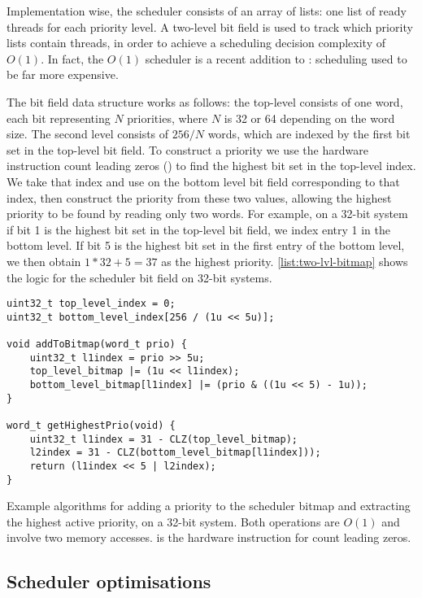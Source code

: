 Implementation wise, the scheduler consists of an array of lists: one list of ready threads for each
priority level. A two-level bit field is used to track which priority lists contain threads, 
in order to achieve a scheduling decision complexity of $O(1)$. In fact, the \(O(1)\) scheduler is a
recent addition to \selfour: scheduling used to be far more expensive.

The bit field data structure works as follows: the
top-level consists of one word, each bit representing $N$ priorities, where $N$ is 32 or 64
depending on the word size. The second level consists of $256/N$ words, which are indexed by the first bit set in the
top-level bit field. To construct a priority we use the hardware instruction count leading zeros
() to find the highest bit set in the top-level index. We take that index and use
 on the bottom level bit field corresponding to that index, then construct the priority
from these two values, allowing the highest priority to be found by reading only two words. For
example, on a 32-bit system 
if bit 1 is the highest bit set in the top-level bit field, we index entry 1 in the
bottom level. If bit 5 is the highest bit set in the first entry of the bottom level, we then obtain
$1 * 32 + 5 = 37$ as the highest priority. 
\cref{list:two-lvl-bitmap} shows the logic for the scheduler bit field on 32-bit systems.

\begin{listing}
    \begin{verbatim}
uint32_t top_level_index = 0;
uint32_t bottom_level_index[256 / (1u << 5u)];

void addToBitmap(word_t prio) {
    uint32_t l1index = prio >> 5u;
    top_level_bitmap |= (1u << l1index);
    bottom_level_bitmap[l1index] |= (prio & ((1u << 5) - 1u));
}

word_t getHighestPrio(void) {
    uint32_t l1index = 31 - CLZ(top_level_bitmap);
    l2index = 31 - CLZ(bottom_level_bitmap[l1index]));
    return (l1index << 5 | l2index);
}
    \end{verbatim}
    \caption{Example algorithms for adding a priority to the scheduler bitmap and extracting the highest
        active priority, on a 32-bit system. Both operations are $O(1)$ and involve two memory
        accesses. 
     is the hardware instruction for count leading zeros.}
    \label{list:two-lvl-bitmap}
\end{listing}

\subsection{Scheduler optimisations}


